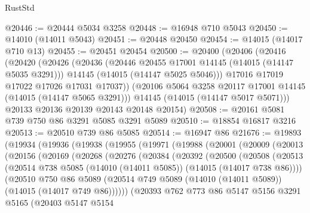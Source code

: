 \begin{lexlean}{RustStd}
\begin{coremodule}
@20446 := @20444 @5034 @3258
@20448 := @16948 @710 @5043
@20450 := @14010 (@14011 @5043)
@20451 := @20448 @20450
@20454 := @14015 (@14017 @710 @13)
@20455 := @20451 @20454
@20500 := @20400
    (@20406
      (@20416
        (@20420
          (@20426
            (@20436
              (@20446 @20455 @17001 @14145 (@14015 (@14147 @5035 @3291)))
              @14145
              (@14015 (@14147 @5025 @5046)))
            @17016
            @17019
            @17022
            @17026
            @17031
            @17037))
        (@20106 @5064 @3258 @20117 @17001 @14145 (@14015 (@14147 @5065 @3291)))
        @14145
        (@14015 (@14147 @5017 @5071)))
      @20133
      @20136
      @20139
      @20143
      @20148
      @20154)
@20508 := @20161 @5081 @739 @750 @86 @3291 @5085 @3291 @5089
@20510 := @18854 @16817 @3216
@20513 := @20510 @739 @86 @5085
@20514 := @16947 @86
@21676 := @19893
    (@19934
      (@19936
        (@19938
          (@19955
            (@19971
              (@19988
                (@20001
                  (@20009
                    (@20013
                      (@20156
                        (@20169
                          (@20268
                            (@20276
                              (@20384
                                (@20392
                                  (@20500
                                    (@20508
                                      (@20513
                                        (@20514
                                          @738
                                          @5085
                                          (@14010 (@14011 @5085))
                                          (@14015 (@14017 @738 @86))))
                                      (@20510
                                        @750
                                        @86
                                        @5089
                                        (@20514
                                          @749
                                          @5089
                                          (@14010 (@14011 @5089))
                                          (@14015 (@14017 @749 @86))))))
                                  (@20393
                                    @762
                                    @773
                                    @86
                                    @5147
                                    @5156
                                    @3291
                                    @5165
                                    (@20403
                                      @5147
                                      @5154

\end{coremodule}
\end{lexlean}
